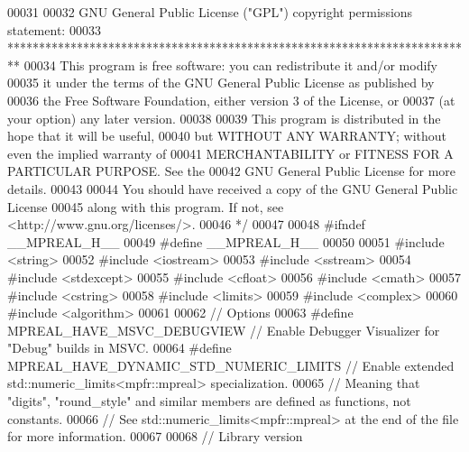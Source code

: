 \begin{DoxyCode}
00031 \textcolor{comment}{}
00032 \textcolor{comment}{    GNU General Public License ("GPL") copyright permissions statement:}
00033 \textcolor{comment}{    **************************************************************************}
00034 \textcolor{comment}{    This program is free software: you can redistribute it and/or modify}
00035 \textcolor{comment}{    it under the terms of the GNU General Public License as published by}
00036 \textcolor{comment}{    the Free Software Foundation, either version 3 of the License, or}
00037 \textcolor{comment}{    (at your option) any later version.}
00038 \textcolor{comment}{}
00039 \textcolor{comment}{    This program is distributed in the hope that it will be useful,}
00040 \textcolor{comment}{    but WITHOUT ANY WARRANTY; without even the implied warranty of}
00041 \textcolor{comment}{    MERCHANTABILITY or FITNESS FOR A PARTICULAR PURPOSE.  See the}
00042 \textcolor{comment}{    GNU General Public License for more details.}
00043 \textcolor{comment}{}
00044 \textcolor{comment}{    You should have received a copy of the GNU General Public License}
00045 \textcolor{comment}{    along with this program.  If not, see <http://www.gnu.org/licenses/>.}
00046 \textcolor{comment}{*/}
00047 
00048 \textcolor{preprocessor}{#ifndef \_\_MPREAL\_H\_\_}
00049 \textcolor{preprocessor}{#define \_\_MPREAL\_H\_\_}
00050 
00051 \textcolor{preprocessor}{#include <string>}
00052 \textcolor{preprocessor}{#include <iostream>}
00053 \textcolor{preprocessor}{#include <sstream>}
00054 \textcolor{preprocessor}{#include <stdexcept>}
00055 \textcolor{preprocessor}{#include <cfloat>}
00056 \textcolor{preprocessor}{#include <cmath>}
00057 \textcolor{preprocessor}{#include <cstring>}
00058 \textcolor{preprocessor}{#include <limits>}
00059 \textcolor{preprocessor}{#include <complex>}
00060 \textcolor{preprocessor}{#include <algorithm>}
00061 
00062 \textcolor{comment}{// Options}
00063 \textcolor{preprocessor}{#define MPREAL\_HAVE\_MSVC\_DEBUGVIEW              // Enable Debugger Visualizer for "Debug" builds in MSVC.}
00064 \textcolor{preprocessor}{#define MPREAL\_HAVE\_DYNAMIC\_STD\_NUMERIC\_LIMITS  // Enable extended std::numeric\_limits<mpfr::mpreal>
       specialization.}
00065                                                 \textcolor{comment}{// Meaning that "digits", "round\_style" and similar members
       are defined as functions, not constants.}
00066                                                 \textcolor{comment}{// See std::numeric\_limits<mpfr::mpreal> at the end of the
       file for more information.}
00067 
00068 \textcolor{comment}{// Library version}

\end{DoxyCode}
